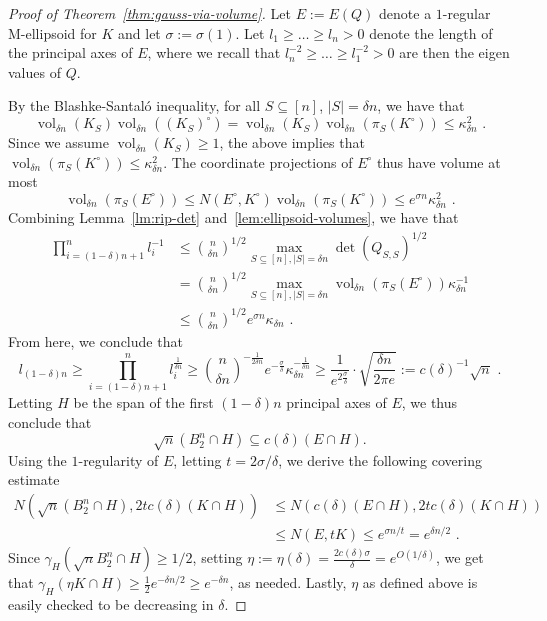 \documentclass[11pt]{article}
\DeclareMathOperator{\vol}{vol}
\begin{document}
\begin{proof}[Proof of Theorem~\ref{thm:gauss-via-volume}]
Let $E := E(Q)$ denote a $1$-regular M-ellipsoid for $K$ and let $\sigma :=
\sigma(1)$. Let $l_1 \geq \dots \geq l_n > 0$ denote
the length of the principal axes of $E$, where we recall that
$l_n^{-2}\geq \dots \geq l_1^{-2} > 0$ are then the eigen values of $Q$.

By the Blashke-Santal{\'o} inequality, for all $S \subseteq
[n]$, $|S|=\delta n$, we have that 
\[
\vol_{\delta n}(K_S)\vol_{\delta n}((K_S)^\circ) = 
\vol_{\delta n}(K_S) \vol_{\delta n}(\pi_S(K^\circ)) \leq
\kappa_{\delta n}^2 \text{ .}
\]
Since we assume $\vol_{\delta n}(K_S) \geq 1$, the above implies that
$\vol_{\delta n}(\pi_S(K^\circ)) \leq \kappa_{\delta n}^2$. The
coordinate projections of $E^\circ$ thus have volume at most 
\[
\vol_{\delta n}(\pi_S(E^\circ)) \leq N(E^\circ,K^\circ)
\vol_{ \delta n}(\pi_S(K^\circ)) \leq e^{\sigma n} \kappa_{\delta n}^2 \text{ .}
\]
Combining Lemma~\ref{lm:rip-det} and~\ref{lem:ellipsoid-volumes}, we have that
\begin{align*}
\prod_{i=(1-\delta)n+1}^n l_i^{-1} &\leq \binom{n}{\delta n}^{1/2} \max_{S \subseteq
[n],|S|=\delta n} \det(Q_{S,S})^{1/2} \\
&= \binom{n}{\delta n}^{1/2} \max_{S \subseteq [n],|S|=\delta n}
\vol_{\delta n}(\pi_S(E^\circ)) \kappa_{\delta n}^{-1} \\
&\leq \binom{n}{\delta n}^{1/2} e^{\sigma n} \kappa_{\delta n} \text{ .}
\end{align*}
From here, we conclude that 
\[
l_{(1-\delta)n} \geq \prod_{i=(1-\delta)n+1}^n l_i^{\frac{1}{\delta
n}} \geq \binom{n}{\delta 
n}^{-\frac{1}{2\delta n}} e^{-\frac{\sigma}{\delta }} \kappa_{\delta
n}^{-\frac{1}{\delta n}} \geq 
\frac{1}{e^{2\frac{\sigma}{\delta }}} \cdot \sqrt{\frac{\delta n}{2\pi e}} :=
c(\delta)^{-1} \sqrt{n} \text{ .}
\] 
Letting $H$ be the span of the first $(1-\delta)n$ principal
axes of $E$, we thus conclude that 
\[
\sqrt{n} (B_2^n \cap H) \subseteq c(\delta) (E \cap H). 
\]
Using the $1$-regularity of $E$, letting $t = 2 \sigma / \delta$, we derive the
following covering estimate 
\begin{align*}
N(\sqrt{n} (B_2^n \cap H), 2 t c(\delta) (K \cap H))
&\leq N(c(\delta)(E \cap H), 2 t c(\delta) (K \cap H)) \\
&\leq N(E, t K) \leq e^{\sigma n / t} = e^{\delta n/2} \text{ .}
\end{align*}
Since $\gamma_H(\sqrt{n} B_2^n \cap H) \geq 1/2$, setting $\eta := \eta(\delta)
=\frac{2c(\delta)\sigma}{\delta} = e^{O(1/\delta)}$, we get that $\gamma_H(\eta K
\cap H) \geq \frac{1}{2} e^{-\delta n/2} \geq e^{-\delta n}$, as needed. Lastly,
$\eta$ as defined above is easily checked to be decreasing in $\delta$.
\end{proof}
\end{document}
